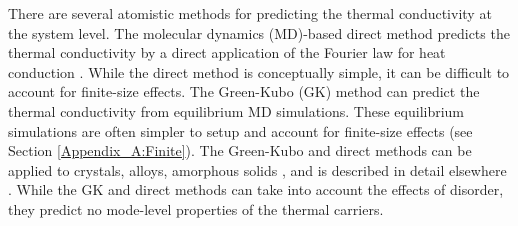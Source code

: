 
There are several atomistic methods for predicting the thermal 
conductivity at the system level. The molecular dynamics (MD)-based 
direct method predicts the thermal conductivity by a direct 
application of the 
Fourier law for heat conduction 
\cite{skye_thermal_2008,landry_complex_2008,
landry_effect_2009,landry_thermal_2009,
turney_predicting_2009,thomas_thermal_2010}. 
While the direct method 
is conceptually simple, it can be difficult to account for finite-size 
effects. The Green-Kubo (GK) 
method can predict the thermal conductivity from equilibrium MD 
simulations. These equilibrium simulations are often simpler 
to setup and account for finite-size effects 
(see Section \ref{Appendix_A:Finite}).  
The Green-Kubo and direct methods can be applied to crystals, alloys, 
amorphous solids 
\cite{mcgaughey_quantitative_2004,mcgaughey_thermal_2004,
landry_complex_2008,he_lattice_2012,
he_heat_2011,he_morphology_2011,he_thermal_2011,turney_predicting_2009,
landry_complex_2008,shiomi_thermal_2011,esfarjani_heat_2011}, 
and is described in detail elsewhere 
\cite{mcquarrie_statistical_2000,mcgaughey_phonon_2004}.
While the GK and direct methods can take into 
account the effects of disorder, 
they predict no mode-level 
properties of the thermal carriers. 

